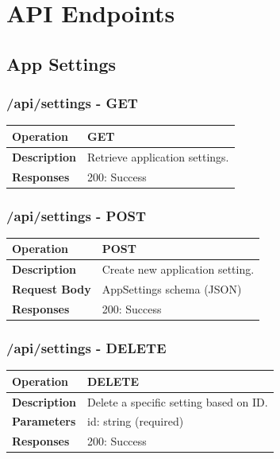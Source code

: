 
\section{API Endpoints}

\subsection{App Settings}

\subsubsection*{/api/settings - GET}
\begin{tabular}{|>{\raggedright\arraybackslash}p{3cm}|p{12cm}|}
\hline
\textbf{Operation} & GET \\
\hline
\textbf{Description} & Retrieve application settings. \\
\hline
\textbf{Responses} & 200: Success \\
\hline
\end{tabular}

\subsubsection*{/api/settings - POST}
\begin{tabular}{|>{\raggedright\arraybackslash}p{3cm}|p{12cm}|}
\hline
\textbf{Operation} & POST \\
\hline
\textbf{Description} & Create new application setting. \\
\hline
\textbf{Request Body} & AppSettings schema (JSON) \\
\hline
\textbf{Responses} & 200: Success \\
\hline
\end{tabular}

\subsubsection*{/api/settings - DELETE}
\begin{tabular}{|>{\raggedright\arraybackslash}p{3cm}|p{12cm}|}
\hline
\textbf{Operation} & DELETE \\
\hline
\textbf{Description} & Delete a specific setting based on ID. \\
\hline
\textbf{Parameters} & id: string (required) \\
\hline
\textbf{Responses} & 200: Success \\
\hline
\end{tabular}

